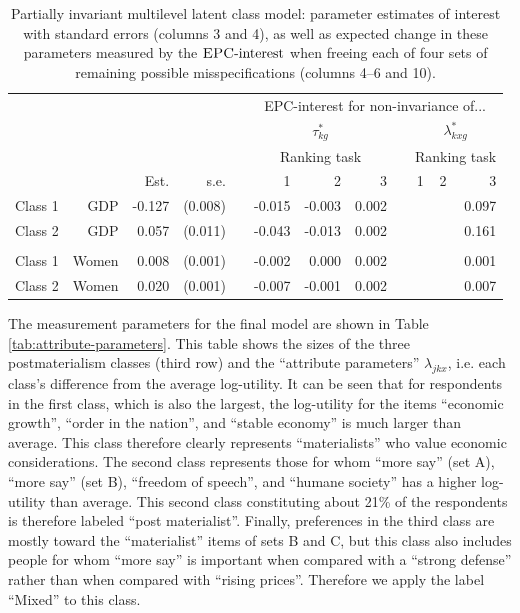 \documentclass[letterpaper,12pt]{article}
\newcommand{\da}{\textrm{{\sc {EPC}}-interest}}
\begin{document}
\begin{table}
	\begin{tabular}{lrrrrrrrrrrr}
	\hline
		&&&&&\multicolumn{7}{c}{EPC-interest for non-invariance of...}\\
	&&&&&\multicolumn{3}{c}{$\tau^{*}_{k g}$} && \multicolumn{3}{c}{$\lambda^{*}_{k x g}$}\\
			\hline
		&&&&&\multicolumn{3}{c}{Ranking task} && \multicolumn{3}{c}{Ranking task}\\
\cline{3-4}\cline{6-8}\cline{10-12}
			&	&	Est.&	s.e.&	&	1  &	2  &	3  &&	  1&	2 &	3\\
				\hline
Class 1&	GDP&	-0.127&	(0.008)&	&	-0.015&	-0.003&	0.002&&	&	&	0.097\\
Class 2&	GDP&	0.057&	(0.011)&	&	-0.043&	-0.013&	0.002&&	&	&	0.161\\
\\
Class 	1&	Women&	0.008&	(0.001)&	&	-0.002&	0.000&	0.002&	&&	&	0.001\\
Class 	2&	Women&	0.020&	(0.001)&	&	-0.007&	-0.001&	0.002&	&&	&	0.007\\
\hline
	\end{tabular}
	\caption{
	Partially invariant multilevel latent class model: parameter estimates of interest with standard errors (columns 3 and 4), as well as expected change in these parameters measured by the  $\da{}$ when freeing each of four sets of remaining possible misspecifications (columns 4--6 and 10).
	\label{tab:epc-interest-model2}}
\end{table}

The measurement parameters for the final model are shown in Table \ref{tab:attribute-parameters}. This table shows the sizes of the three postmaterialism classes (third row) and the ``attribute parameters'' $\lambda_{jkx}$, i.e. each class's difference from the average log-utility. It can be seen that for respondents in the first class, which is also the largest, the log-utility for the items ``economic growth'', ``order in the nation'', and ``stable economy'' is much larger than average. This class therefore clearly represents ``materialists'' who value economic considerations. The second class represents those for whom ``more say''  (set A), ``more say''  (set B), ``freedom of speech'', and ``humane society'' has a higher log-utility than average. This second class constituting about 21\% of the respondents is therefore labeled ``post materialist''. Finally, preferences in the third class are mostly toward the ``materialist'' items of sets B and C, but this class also includes people for whom ``more say'' is important when compared with a ``strong defense'' rather than when compared with ``rising prices''. Therefore we apply the label ``Mixed'' to this class. 
\end{document}
